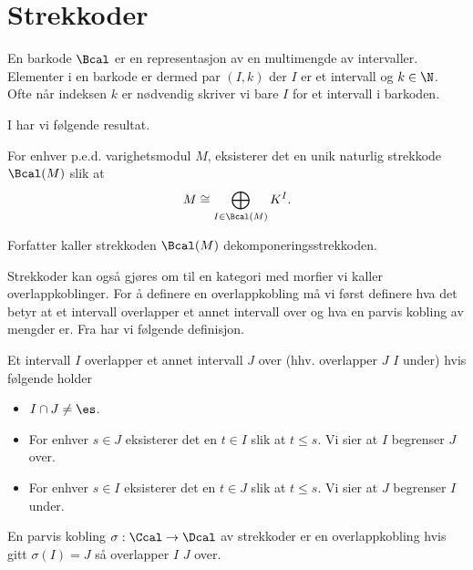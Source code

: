 \section{Strekkoder}
En barkode $\Bcal$ er en representasjon av en multimengde
av intervaller. Elementer i en barkode er dermed par
$(I,k)$ der $I$ er et intervall og $k\in\N$. Ofte når
indeksen $k$ er nødvendig skriver vi bare $I$ for et
intervall i barkoden.

I \citep[teorem 2.4]{Bauer2018} har vi følgende resultat.
\begin{teorem}\label{trm:DekompBark}
  For enhver p.e.d. varighetsmodul $M$, eksisterer det en
  unik naturlig strekkode $\Bcal(M)$ slik at
  \[M\cong \bigoplus_{I\in\Bcal(M)} K^I.\]
\end{teorem}
Forfatter kaller strekkoden $\Bcal(M)$
dekomponeringsstrekkoden.

%

Strekkoder kan også gjøres om til en kategori med morfier
vi kaller overlappkoblinger. For å definere en overlappkobling
må vi først definere hva det betyr at et intervall
overlapper et annet intervall over og hva en parvis
kobling av mengder er. Fra \citep[seksjon 2.3]{Bauer2018}
har vi følgende definisjon.

\begin{definisjon}
    Et intervall $I$ overlapper et annet intervall $J$
    over (hhv. overlapper $J$  $I$ under) hvis følgende
    holder
    \begin{itemize}
        \item $I\cap J\neq\es$.
        \item For enhver $s\in J$ eksisterer det en $t\in I$ slik at $t\leq s$. Vi sier at $I$ begrenser $J$ over.
        \item For enhver $s\in I$ eksisterer det en $t\in J$ slik at $t\leq s$. Vi sier at $J$ begrenser $I$ under.
    \end{itemize}
\end{definisjon}

\begin{definisjon}\label{def:OverlappMch}
  En parvis kobling $\sigma: \Ccal\to \Dcal$ av strekkoder
  er en overlappkobling hvis gitt $\sigma(I)=J$ så
  overlapper $I$ $J$ over.
\end{definisjon}

